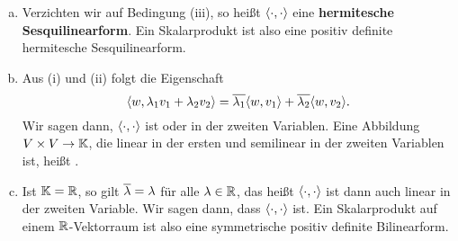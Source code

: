 \begin{bemerkung}
	\label{bem:3.2}
	\begin{enumerate}[(a)]
		\item Verzichten wir auf Bedingung (iii), so heißt $\langle\cdot,\cdot\rangle$  eine \textbf{hermitesche Sesquilinearform}.
		Ein Skalarprodukt ist also eine positiv definite hermitesche Sesquilinearform. 
		\item Aus (i) und (ii) folgt die Eigenschaft
		\begin{equation}
			\sk{w,\lambda_1v_1+\lambda_2v_2} = \ol{\lambda_1} \sk{w,v_1} + \ol{\lambda_2} \sk{w,v_2}. \label{eq:antilin}
		\end{equation}
		Wir sagen dann, $\langle\cdot,\cdot\rangle$ ist  oder  in der zweiten Variablen.
		Eine Abbildung $V \times V \rightarrow \mathbb{K}$, die linear in der ersten und semilinear in der zweiten Variablen ist, heißt .
		\item Ist $\mathbb{K} = \mathbb{R}$, so gilt $\overline{\lambda} = \lambda$ für alle $\lambda \in \mathbb{R}$, das heißt $\langle\cdot,\cdot\rangle$ ist dann auch linear in der zweiten Variable.
		Wir sagen dann, dass $\langle\cdot,\cdot\rangle$  ist.
		Ein Skalarprodukt auf einem $\mathbb{R}$-Vektorraum ist also eine symmetrische positiv definite Bilinearform.
	\end{enumerate}
\end{bemerkung}

